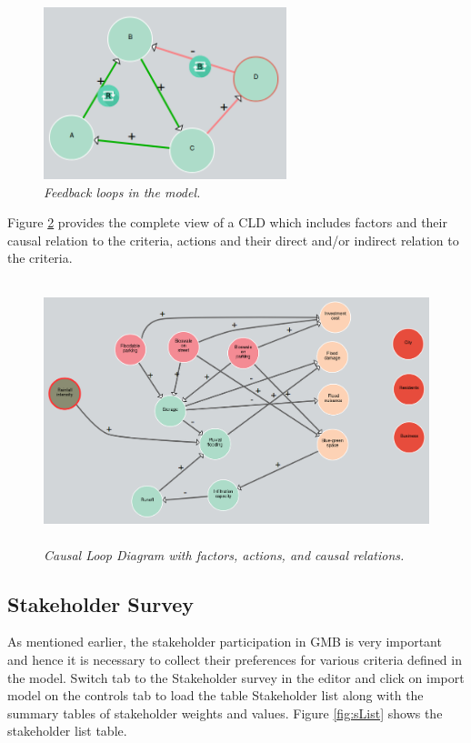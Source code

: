 \documentclass[a4paper]{article}
\begin{document}
\begin{figure}
\begin{center}
\includegraphics[width=0.75\linewidth, height=5cm]{img/loops.png}
\caption{\small \sl Feedback loops in the model.\label{fig:loops}}
\end{center}
\end{figure}

Figure \ref{fig:cld} provides the complete view of a CLD which includes factors and their causal relation to the criteria, actions and their direct and/or indirect relation to the criteria.

\begin{figure}
\begin{center}
\includegraphics[height=3in,width=5in]{img/cld.png}
\caption{\small \sl Causal Loop Diagram with factors, actions, and causal relations.\label{fig:cld}}
\end{center}
\end{figure}

\subsection{Stakeholder Survey}

As mentioned earlier, the stakeholder participation in GMB is very important and hence it is necessary to collect their preferences for various criteria defined in the model. Switch tab to the Stakeholder survey in the editor and click on import model on the controls tab to load the table Stakeholder list along with the summary tables of stakeholder weights and values. Figure \ref{fig:sList} shows the stakeholder list table.
\end{document}
